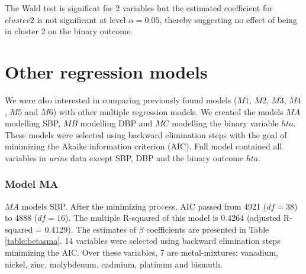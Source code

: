 The Wald test is significat for 2 variables but the estimated coefficient for $cluster2$ is not significant at level $\alpha=0.05$, thereby suggesting no effect of being in cluster 2 on the binary outcome.

\section{Other regression models}
We were also interested in comparing previously found models ($M1$, $M2$, $M3$, $M4$, $M5$ and $M6$) with other multiple regression models. We created the models $MA$ modelling SBP, $MB$ modelling DBP and $MC$ modelling the binary variable $hta$. These models were selected using backward elimination steps with the goal of minimizing the Akaike information criterion (AIC). Full model contained all variables in \emph{urine} data except SBP, DBP and the binary outcome $hta$.

\subsubsection{Model MA}
$MA$ models SBP. After the minimizing process, AIC passed from 4921 ($df=38$) to 4888 ($df=16$). The multiple R-squared of this model is 0.4264 (adjusted R-squared = 0.4129). The estimates of $\beta$ coefficients are presented in Table \ref{table:betasma}. 14 variables were selected using backward elimination steps minimizing the AIC. Over these variables, 7 are metal-mixtures: vanadium, nickel, zinc, molybdenum, cadmium, platinum and bismuth. 

